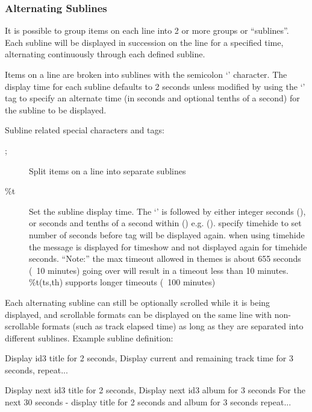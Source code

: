 
\subsubsection{\label{ref:AlternatingSublines}Alternating Sublines}

It is possible to group items on each line into 2 or more groups or
``sublines''. Each subline will be displayed in succession on the line for a
specified time, alternating continuously through each defined subline.

Items on a line are broken into sublines with the semicolon
`\config{;}' character. The display time for
each subline defaults to 2 seconds unless modified by using the
`' tag to specify an alternate
time (in seconds and optional tenths of a second) for the subline to be
displayed.

Subline related special characters and tags:
\begin{description}
\item[;] Split items on a line into separate sublines
\item[\%t] Set the subline display time. The
`' is followed by either integer seconds (), or seconds
and tenths of a second within () e.g. ().
specify timehide to set number of seconds before tag will be displayed again.
when using timehide the message is displayed for timeshow and not displayed again for timehide seconds.
``Note:'' the max timeout allowed in themes is about 655 seconds (~10 minutes) going over will result in a timeout less than 10 minutes.
        \%t(ts,th) supports longer timeouts (~100 minutes)
\end{description}

Each alternating subline can still be optionally scrolled while it is
being displayed, and scrollable formats can be displayed on the same
line with non{}-scrollable formats (such as track elapsed time) as long
as they are separated into different sublines.
Example subline definition:
\begin{example}
                                 Display id3 title for 2 seconds,
                                 Display current and remaining track time
                                 for 3 seconds,
                                 repeat...

                                 Display next id3 title for 2 seconds,
                                 Display next id3 album for 3 seconds
                                 For the next 30 seconds - display title for 2 seconds and album for 3 seconds
                                 repeat...
\end{example}

